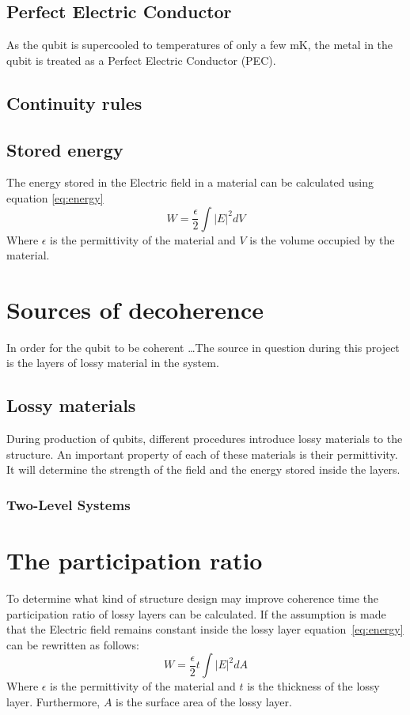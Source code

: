 \subsection{Perfect Electric Conductor}
As the qubit is supercooled to temperatures of only a few mK, the metal in the qubit is treated as a Perfect Electric Conductor (PEC).
\subsection{Continuity rules}
\subsection{Stored energy}
The energy stored in the Electric field in a material can be calculated using equation \eqref{eq:energy}
\begin{equation} \label{eq:energy}
	W = \frac{\epsilon}{2}\int{|E|}^{2}dV
\end{equation}
Where \(\epsilon\) is the permittivity of the material and \(V\) is the volume occupied by the material.

\section{Sources of decoherence}
In order for the qubit to be coherent \ldots The source in question during this project is the layers of lossy material in the system.
\subsection{Lossy materials}
During production of qubits, different procedures introduce lossy materials to the structure. An important property of each of these materials is their permittivity. It will determine the strength of the field and the energy stored inside the layers.
\subsubsection{Two-Level Systems}

\section{The participation ratio}
To determine what kind of structure design may improve coherence time the participation ratio of lossy layers can be calculated. If the assumption is made that the Electric field remains constant inside the lossy layer equation~\eqref{eq:energy} can be rewritten as follows:
\begin{equation}\label{eq:energy_layer}
W = \frac{\epsilon}{2}t\int{|E|}^{2}dA
\end{equation}
Where \(\epsilon\) is the permittivity of the material and \(t\) is the thickness of the lossy layer. Furthermore, \(A\) is the surface area of the lossy layer.


